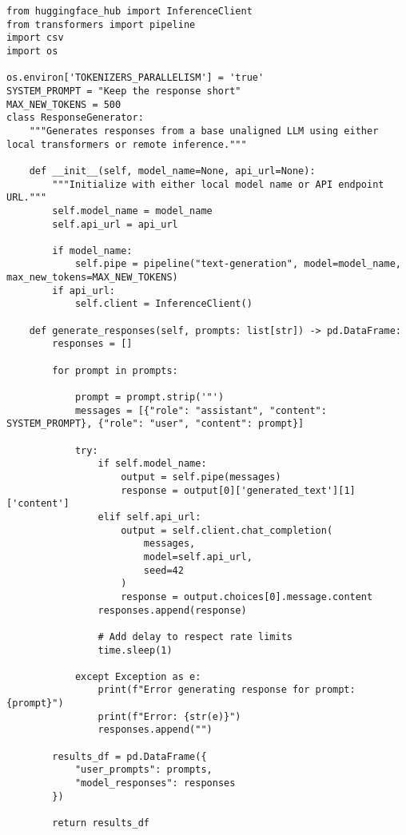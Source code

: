 \begin{verbatim}
from huggingface_hub import InferenceClient
from transformers import pipeline
import csv
import os

os.environ['TOKENIZERS_PARALLELISM'] = 'true'
SYSTEM_PROMPT = "Keep the response short"
MAX_NEW_TOKENS = 500
class ResponseGenerator:
    """Generates responses from a base unaligned LLM using either local transformers or remote inference."""
    
    def __init__(self, model_name=None, api_url=None):
        """Initialize with either local model name or API endpoint URL."""
        self.model_name = model_name
        self.api_url = api_url
        
        if model_name:
            self.pipe = pipeline("text-generation", model=model_name, max_new_tokens=MAX_NEW_TOKENS)
        if api_url:
            self.client = InferenceClient()
            
    def generate_responses(self, prompts: list[str]) -> pd.DataFrame:
        responses = []
        
        for prompt in prompts:
            
            prompt = prompt.strip('"')
            messages = [{"role": "assistant", "content": SYSTEM_PROMPT}, {"role": "user", "content": prompt}]
            
            try:
                if self.model_name:
                    output = self.pipe(messages)
                    response = output[0]['generated_text'][1]['content']
                elif self.api_url:
                    output = self.client.chat_completion(
                        messages,
                        model=self.api_url, 
                        seed=42
                    )
                    response = output.choices[0].message.content
                responses.append(response)
                
                # Add delay to respect rate limits
                time.sleep(1)
                
            except Exception as e:
                print(f"Error generating response for prompt: {prompt}")
                print(f"Error: {str(e)}")
                responses.append("")
                
        results_df = pd.DataFrame({
            "user_prompts": prompts,
            "model_responses": responses
        })
        
        return results_df
\end{verbatim}


